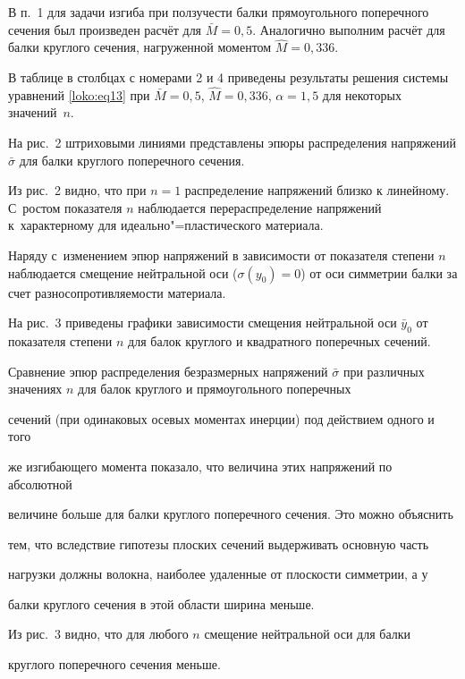 В п.~1 для задачи изгиба при ползучести балки прямоугольного поперечного сечения был произведен расчёт для $\bar {M}=0,5$. Аналогично выполним расчёт для балки круглого сечения, нагруженной моментом $\hat {M}=0,336$.



В таблице в столбцах с номерами  2 и 4 приведены результаты решения системы уравнений \eqref{loko:eq13} при $\bar {M}=0,5$, $\hat {M}=0,336$, $\alpha =1,5$ для некоторых значений~$n$.

На рис.~2 штриховыми линиями представлены эпюры распределения напряжений $\bar {\sigma }$ для балки круглого поперечного сечения.



Из рис.~2 видно, что при $n=1$ распределение напряжений близко к линейному. С~ростом показателя $n$ наблюдается перераспределение напряжений к~характерному для идеально"=пластического материала. 

Наряду с~изменением эпюр напряжений в зависимости от показателя степени $n$ наблюдается смещение нейтральной оси ($\sigma (y_0) = 0$) от оси симметрии балки за счет разносопротивляемости материала.



На рис.~3 приведены графики зависимости смещения нейтральной оси $\bar{y}_0$ от показателя степени $n$ для балок круглого и квадратного поперечных сечений.



Сравнение эпюр распределения безразмерных напряжений $\bar {\sigma }$ при различных значениях $n$ для балок круглого и прямоугольного поперечных

сечений (при одинаковых осевых моментах инерции) под действием одного и того

же изгибающего момента показало, что величина этих напряжений по абсолютной

величине больше для балки круглого поперечного сечения. Это можно объяснить

тем, что вследствие гипотезы плоских сечений выдерживать основную часть

нагрузки должны волокна, наиболее удаленные от плоскости симметрии, а у

балки круглого сечения в этой области ширина меньше.



Из рис.~3 видно, что для любого $n$ смещение нейтральной оси для балки

круглого поперечного сечения меньше.



